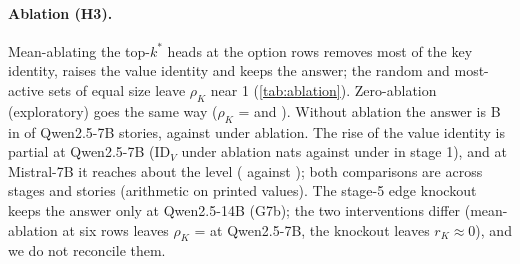 \begin{table}[!ht]
\centering
\caption{\textbf{Every ablation condition} (preregistration H, part (a); 60 held-out stories). $\rho_K$: $\mathrm{ID}_K$ under ablation at the six option rows, relative to none; $\Delta\mathrm{ID}_V$: rise of the value identity (nats); kept: fraction of stories whose candidate-restricted clean answer is still B. ``mean'': mean-ablation with the head's position-matched mean over the ranking stories; ``zero'': zero-ablation. H3 uses the top-$k^*$ mean row, the three random sets and the most-active set under \fmtOpt{}; every other cell is exploratory.}
\label{tab:ablation}
\resizebox{\textwidth}{!}{}
\end{table}

\paragraph{Ablation (H3).} Mean-ablating the top-$k^*$ heads at the option rows removes most of the key identity, raises the value identity and keeps the answer; the random and most-active sets of equal size leave $\rho_K$ near 1 (\cref{tab:ablation}). Zero-ablation (exploratory) goes the same way ($\rho_K$ = \HablTopkzeroRhoOptQwenSeven{} and \HablTopkzeroRhoOptMistralSeven{}). Without ablation the answer is B in \HablNoneBaseOptQwenSeven{} of Qwen2.5-7B stories, against \HthreeBaseQwenSeven{} under ablation. The rise of the value identity is partial at Qwen2.5-7B ($\mathrm{ID}_V$ under ablation \HablIDVafterQwenSeven{} nats against \idVNoneQwenSeven{} under \fmtNone{} in stage 1), and at Mistral-7B it reaches about the \fmtNone{} level (\HablIDVafterMistralSeven{} against \idVNoneMistralSeven{}); both comparisons are across stages and stories (arithmetic on printed values). The stage-5 edge knockout keeps the answer only at Qwen2.5-14B (G7b); the two interventions differ (mean-ablation at six rows leaves $\rho_K$ = \HthreeRhoQwenSeven{} at Qwen2.5-7B, the knockout leaves $r_K \approx 0$), and we do not reconcile them.

